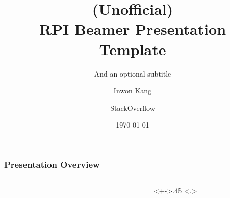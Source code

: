 \documentclass[
	10pt, %
	aspectratio=169, %
]{beamer}
\title[A Short Title for Your Slides]{(Unofficial)\\RPI Beamer Presentation Template}
\subtitle{And an optional subtitle} %
\author[]{Inwon Kang \and StackOverflow} %
\institute[RPI]{Department of Computer Science}
\date[\today]{\today}
\begin{document}
\begin{frame}[plain]
	\titlepage %
\end{frame}



\begin{frame}[noframenumbering]
	\frametitle{Presentation Overview} %
	\begin{columns}[t]
		\begin{column}{.05\textwidth}
		\end{column}
		\begin{column}{.45\textwidth}
			\tableofcontents[
				pausesections,
				sections={-3}
			]
		\end{column}
		\begin{column}<+->{.45\textwidth}
			\only<.>{\setcounter{tocseccounter}{\slideinframe}}
			\advanceslidecounter{-\thetocseccounter}
			\tableofcontents[
				pausesections,
				sections={4-}
			]
		\end{column}
	\end{columns}

\end{frame}

\end{document}
